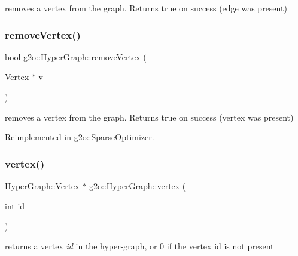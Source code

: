 removes a vertex from the graph. Returns true on success (edge was present) 

\mbox{\label{classg2o_1_1_hyper_graph_a97ab8302aa027d513253387bba9e0dd5}} 
\subsubsection{\texorpdfstring{remove\+Vertex()}{removeVertex()}}
{\footnotesize\ttfamily bool g2o\+::\+Hyper\+Graph\+::remove\+Vertex (\begin{DoxyParamCaption}\item[{\mbox{\hyperlink{classg2o_1_1_hyper_graph_1_1_vertex}{Vertex}} $\ast$}]{v }\end{DoxyParamCaption})\hspace{0.3cm}{\ttfamily [virtual]}}



removes a vertex from the graph. Returns true on success (vertex was present) 



Reimplemented in \mbox{\hyperlink{classg2o_1_1_sparse_optimizer_a0fb2a5e2b250bf2530a600f6dcaad03f}{g2o\+::\+Sparse\+Optimizer}}.

\mbox{\label{classg2o_1_1_hyper_graph_ab07fe8bd9982a66ba34e83dff8317ea2}} 
\subsubsection{\texorpdfstring{vertex()}{vertex()}\hspace{0.1cm}{\footnotesize\ttfamily [1/2]}}
{\footnotesize\ttfamily \mbox{\hyperlink{classg2o_1_1_hyper_graph_1_1_vertex}{Hyper\+Graph\+::\+Vertex}} $\ast$ g2o\+::\+Hyper\+Graph\+::vertex (\begin{DoxyParamCaption}\item[{int}]{id }\end{DoxyParamCaption})}



returns a vertex {\itshape id} in the hyper-\/graph, or 0 if the vertex id is not present 

